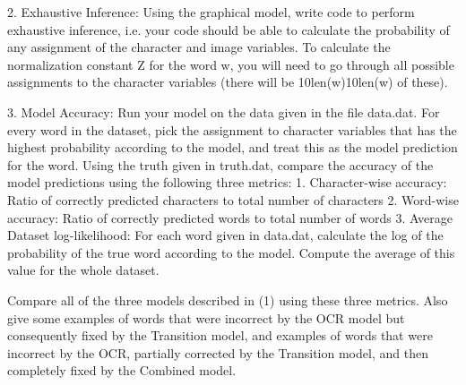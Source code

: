 2. Exhaustive Inference: Using the graphical model, write code to perform exhaustive inference, i.e. your code should be able to calculate the probability of any assignment of the character and image variables. To calculate the normalization constant Z for the word w, you will need to go through all possible assignments to the character variables (there will be 10len(w)10len(w) of these).

3. Model Accuracy: Run your model on the data given in the file data.dat. For every word in the dataset, pick the assignment to character variables that has the highest probability according to the model, and treat this as the model prediction for the word. Using the truth given in truth.dat, compare the accuracy of the model predictions using the following three metrics: 1. Character-wise accuracy: Ratio of correctly predicted characters to total number of characters 2. Word-wise accuracy: Ratio of correctly predicted words to total number of words 3. Average Dataset log-likelihood: For each word given in data.dat, calculate the log of the probability of the true word according to the model. Compute the average of this value for the whole dataset.

Compare all of the three models described in (1) using these three metrics. Also give some examples of words that were incorrect by the OCR model but consequently fixed by the Transition model, and examples of words that were incorrect by the OCR, partially corrected by the Transition model, and then completely fixed by the Combined model.



